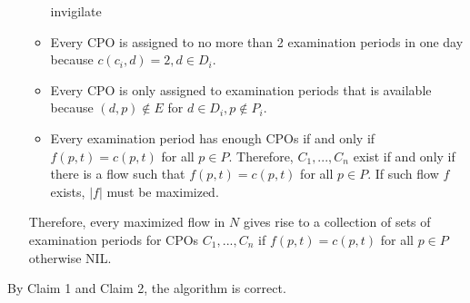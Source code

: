 \documentclass[11pt]{article}
\begin{document}
\begin{enumerate}
\begin{itemize}
            invigilate
                \item
                    Every CPO is assigned to no more than 2 examination periods in one day because $c(c_i, d) = 2, d\in D_i$.
                \item
                    Every CPO is only assigned to examination periods that is available because $(d, p) \notin E$ for $d\in D_i, p\notin P_i$.
                \item
                    Every examination period has enough CPOs if and only if $f(p, t) = c(p,t)$ for all $p\in P$. Therefore, $C_1, ..., C_n$ exist if and only if there is a flow such that $f(p, t) = c(p,t)$ for all $p\in P$. If such flow $f$ exists, $|f|$ must be maximized.
                    
                \end{itemize}
            Therefore, every maximized flow in $N$ gives rise to a collection of sets of examination periods for CPOs $C_1, ..., C_n$ if $f(p, t) = c(p,t)$ for all $p\in P$ otherwise NIL.
            

                
\end{enumerate}
By Claim 1 and Claim 2, the algorithm is correct.
\end{document}
